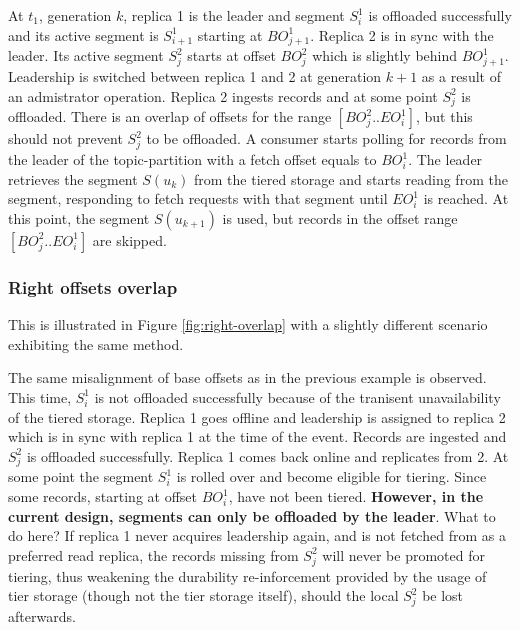 \documentclass{article}
\begin{document}
\begin{outline}[enumerate]
	\1 At $t_1$, generation $k$, replica 1 is the leader and segment $S_i^1$ is offloaded successfully and its active segment is $S_{i+1}^1$ starting at $BO_{j+1}^1$. Replica 2 is in sync with the leader. Its active segment $S_j^2$ starts at offset $BO_j^2$ which is slightly behind $BO_{j+1}^1$. 
	\1 Leadership is switched between replica 1 and 2 at generation $k+1$ as a result of an admistrator operation. Replica 2 ingests records and at some point $S_j^2$ is offloaded. There is an overlap of offsets for the range $[BO_j^2..EO_i^1]$, but this should not prevent $S_j^2$ to be offloaded.
	\1 A consumer starts polling for records from the leader of the topic-partition with a fetch offset equals to $BO_i^1$. The leader retrieves the segment $S(u_k)$ from the tiered storage and starts reading from the segment, responding to fetch requests with that segment until $EO_i^1$ is reached. At this point, the segment $S(u_{k+1})$ is used, but records in the offset range $[BO_j^2..EO_i^1]$ are skipped. 
\end{outline}

\subsubsection{Right offsets overlap}

This is illustrated in Figure \ref{fig:right-overlap} with a slightly different scenario exhibiting the same method.

\begin{outline}[enumerate]
	\1 The same misalignment of base offsets as in the previous example is observed. This time, $S_i^1$ is not offloaded successfully because of the tranisent unavailability of the tiered storage.
	\1 Replica 1 goes offline and leadership is assigned to replica 2 which is in sync with replica 1 at the time of the event. Records are ingested and $S_j^2$ is offloaded successfully.
	\1 Replica 1 comes back online and replicates from 2. At some point the segment $S_i^1$ is rolled over and become eligible for tiering. Since some records, starting at offset $BO_i^1$, have not been tiered. \textbf{However, in the current design, segments can only be offloaded by the leader}. What to do here? If replica 1 never acquires leadership again, and is not fetched from as a preferred read replica, the records missing from $S_j^2$ will never be promoted for tiering, thus weakening the durability re-inforcement provided by the usage of tier storage (though not the tier storage itself), should the local $S_j^2$ be lost afterwards. 
\end{outline}
\end{document}
